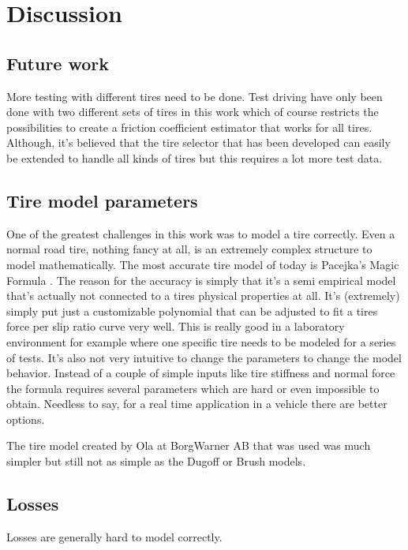 \chapter{Discussion}

\section{Future work}
More testing with different tires need to be done. Test driving have only been done with two different sets of tires in this work which of course restricts the possibilities to create a friction coefficient estimator that works for all tires. Although, it's believed that the tire selector that has been developed can easily be extended to handle all kinds of tires but this requires a lot more test data.

\section{Tire model parameters}
One of the greatest challenges in this work was to model a tire correctly. Even a normal road tire, nothing fancy at all, is an extremely complex structure to model mathematically. The most accurate tire model of today is Pacejka's Magic Formula \cite{pacejka}. The reason for the accuracy is simply that it's a semi empirical model that's actually not connected to a tires physical properties at all. It's (extremely) simply put just a customizable polynomial that can be adjusted to fit a tires force per slip ratio curve very well. This is really good in a laboratory environment for example where one specific tire needs to be modeled for a series of tests. It's also not very intuitive to change the parameters to change the model behavior. Instead of a couple of simple inputs like tire stiffness and normal force the formula requires several parameters which are hard or even impossible to obtain. Needless to say, for a real time application in a vehicle there are better options.

The tire model created by Ola at BorgWarner AB that was used was much simpler but still not as simple as the Dugoff or Brush models.  


\section{Losses}
Losses are generally hard to model correctly.

